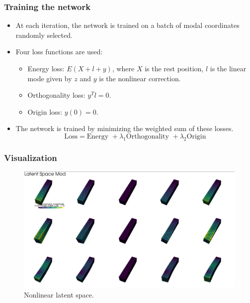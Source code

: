 \documentclass{beamer}
\begin{document}
\begin{frame}
    \frametitle{Training the network}
    \begin{itemize}
        \item At each iteration, the network is trained on a batch of modal coordinates randomly selected.
        \item Four loss functions are used:
        \begin{itemize}
            \item Energy loss: \( E(X + l + y)\), where \(X\) is the rest position, \(l\) is the linear mode given by \(z\) and \(y\) is the nonlinear correction.
            \item Orthogonality loss: \( y^T l = 0 \).
            \item Origin loss: \( y(0) = 0 \).
        \end{itemize}
        \item The network is trained by minimizing the weighted sum of these losses.
        \[
        \text{Loss} = \text{Energy } + \lambda_1 \text{Orthogonality } + \lambda_2 \text{Origin}
        \]
    \end{itemize}
\end{frame}

\begin{frame}
    \frametitle{Visualization}
    \begin{figure}
        \centering
        \includegraphics[scale=0.15]{Images/image.png}
        \caption{Nonlinear latent space.}
    \end{figure}
\end{frame}
\end{document}
